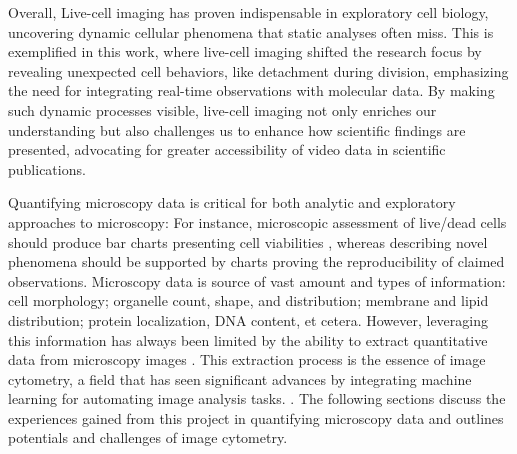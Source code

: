 Overall, Live-cell imaging has proven indispensable in exploratory cell biology,
uncovering dynamic cellular phenomena that static analyses often miss. This is
exemplified in this work, where live-cell imaging shifted the research focus
by revealing unexpected cell behaviors, like detachment during division,
emphasizing the need for integrating real-time observations with molecular data.
By making such dynamic processes visible, live-cell imaging not only enriches
our understanding but also challenges us to enhance how scientific findings are
presented, advocating for greater accessibility of video data in scientific
publications.

\newpage


%
\label{sec:discussion_quantifying_microscopy}%
Quantifying microscopy data is critical for both analytic and exploratory
approaches to microscopy: For instance, microscopic assessment of live/dead
cells should produce bar charts presenting cell viabilities
\cite{spaepenDigitalImageProcessing2011}, whereas describing novel phenomena
should be supported by charts proving the reproducibility of claimed
observations. Microscopy data is source of vast amount and types of information:
cell morphology; organelle count, shape, and distribution; membrane and lipid
distribution; protein localization, DNA content, et cetera. However, leveraging
this information has always been limited by the ability to extract quantitative
data from microscopy images \cite{galbraithPumpingVolume2023}. This extraction
process is the essence of image cytometry, a field that has seen significant
advances by integrating machine learning for automating image analysis tasks.
\cite{guptaDeepLearningImage2019}. The following sections discuss the
experiences gained from this project in quantifying microscopy data and outlines
potentials and challenges of image cytometry.








